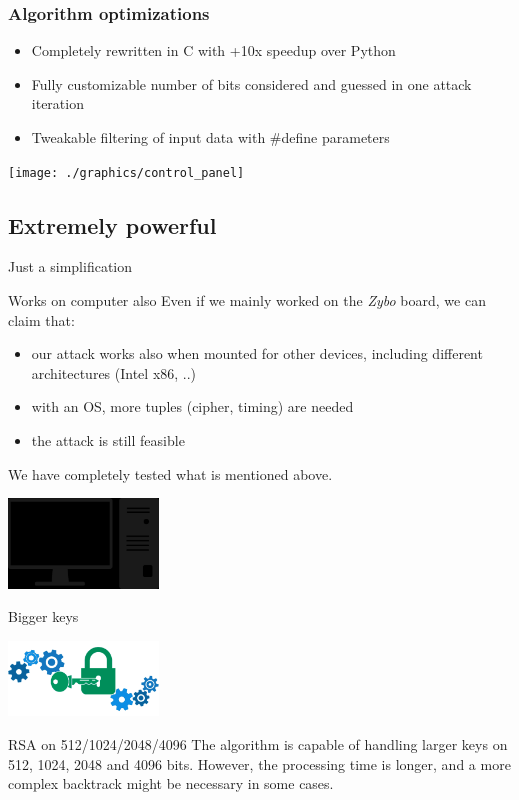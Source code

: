 \documentclass{beamer}
\begin{document}
\begin{frame}[fragile]
    \frametitle{Algorithm optimizations}
    \begin{block}{}
        \begin{itemize}
            \item Completely rewritten in C with +10x speedup over Python
            \item Fully customizable number of bits considered and guessed in one attack iteration
            \item Tweakable filtering of input data with \#define parameters
        \end{itemize}
    \end{block}
    \hfill \texttt{[image: ./graphics/control\_panel]}
\end{frame}




\subsection{Extremely powerful}
\begin{frame}{Just a simplification}
	\begin{block}{Works on computer also}
		Even if we mainly worked on the \textit{Zybo} board, we can claim that:
		\begin{itemize}
			\item our attack works also when mounted for other devices, including different architectures (Intel x86, ..)
			\item with an  OS, more tuples (cipher, timing) are needed
			\item the attack is still feasible
		\end{itemize}
    We have completely tested what is mentioned above.
    \begin{center}
      \includegraphics[width=4cm]{./graphics/pc}
    \end{center}
	\end{block}
\end{frame}

\begin{frame}{Bigger keys}
  \begin{center}
    \includegraphics[width=4cm]{./graphics/key}
  \end{center}
  \begin{block}{RSA on 512/1024/2048/4096}
		The algorithm is capable of handling larger keys on 512, 1024, 2048 and 4096 bits.
    However, the processing time is longer, and a more complex backtrack might be necessary in some cases.
	\end{block}
\end{frame}
\end{document}
